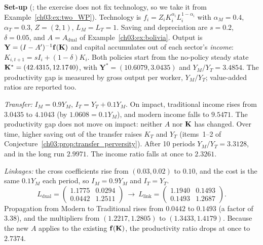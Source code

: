 \documentclass[../solutions_manual.tex]{subfiles}
\begin{document}

\textbf{Set-up} (\illustrative; the exercise does not fix technology, so we take it from Example~\ref{ch03:ex:two_WP}). Technology is $f_i = Z_iK_i^{\alpha_i}L_i^{1-\alpha_i}$ with $\alpha_M = 0.4$, $\alpha_T = 0.3$, $Z = (2, 1)$, $L_M = L_T = 1$. Saving and depreciation are $s = 0.2$, $\delta = 0.05$, and $A = A_{\text{dual}}$ of Example~\ref{ch03:ex:bolivia}. Output is $\mathbf Y = (I - A')^{-1}\mathbf f(\mathbf{K})$ and capital accumulates out of each sector's \emph{income}: $K_{i,t+1} = sI_i + (1-\delta)K_i$. Both policies start from the no-policy steady state $\mathbf{K}^* = (42.4315, 12.1740)$, with $\mathbf Y^* = (10.6079, 3.0435)$ and $Y_M/Y_T = 3.4854$. The productivity gap is measured by gross output per worker, $Y_M/Y_T$; value-added ratios are reported too.

 \emph{Transfer:} $I_M = 0.9Y_M$, $I_T = Y_T + 0.1Y_M$. On impact, traditional income rises from $3.0435$ to $4.1043$ (by $1.0608 = 0.1Y_M$), and modern income falls to $9.5471$. The productivity gap does not move on impact: neither $A$ nor $\mathbf{K}$ has changed. Over time, higher saving out of the transfer raises $K_T$ and $Y_T$ (items~1--2 of Conjecture~\ref{ch03:prop:transfer_perversity}). After 10 periods $Y_M/Y_T = 3.3128$, and in the long run $2.9971$. The income ratio falls at once to $2.3261$.

 \emph{Linkages:} the cross coefficients rise from $(0.03, 0.02)$ to $0.10$, and the cost is the same $0.1Y_M$ each period, so $I_M = 0.9Y_M$ and $I_T = Y_T$.
\[
L_{\text{dual}} = \begin{pmatrix} 1.1775 & 0.0294\\ 0.0442 & 1.2511\end{pmatrix} \ \longrightarrow\ L_{\text{link}} = \begin{pmatrix} 1.1940 & 0.1493\\ 0.1493 & 1.2687\end{pmatrix}.
\]
Propagation from Modern to Traditional rises from $0.0442$ to $0.1493$ (a factor of $3.38$), and the multipliers from $(1.2217, 1.2805)$ to $(1.3433, 1.4179)$. Because the new $A$ applies to the existing $\mathbf f(\mathbf{K})$, the productivity ratio drops at once to $2.7374$.
\end{document}

